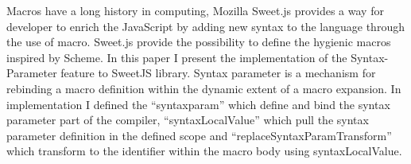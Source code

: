 Macros have a long history in computing, Mozilla Sweet.js provides a way for developer to enrich the JavaScript by adding new syntax to the language through the use of macro. Sweet.js provide the possibility to define the hygienic macros inspired by Scheme. In this paper I present the implementation of the Syntax-Parameter feature to SweetJS library. Syntax parameter is a mechanism for rebinding a macro definition within the dynamic extent of a macro expansion. In implementation I defined the ``syntaxparam'' which define and bind the syntax parameter part of the compiler, ``syntaxLocalValue'' which pull the syntax parameter definition in the defined scope and ``replaceSyntaxParamTransform'' which transform to the identifier within the macro body using syntaxLocalValue.
